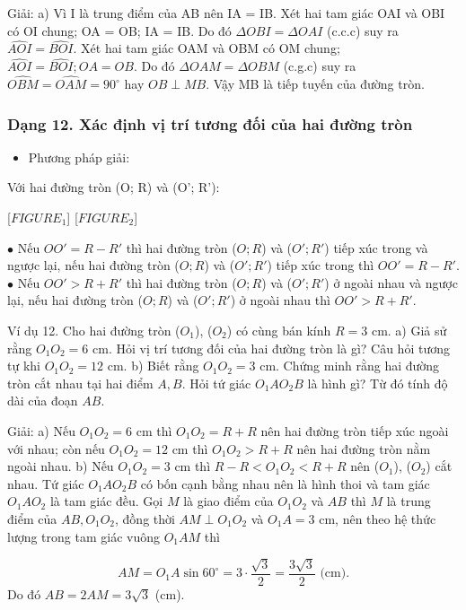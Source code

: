 \documentclass[%
    fontsize=12pt,%
    chapterprefix=false,%
    open=right,%
    twoside=false,%
    numbers=noenddot,%
    headings=optiontohead,%
    final,%
    DIV=15,%
    parskip=half %
]{scrbook}
\begin{document}
Giải: a) Vì I là trung điểm của AB nên IA = IB. Xét hai tam giác OAI và OBI có OI chung; OA = OB; IA = IB. Do đó $ \Delta OBI = \Delta OAI $ (c.c.c) suy ra $ \widehat{AOI} = \widehat{BOI} $. Xét hai tam giác OAM và OBM có OM chung; $ \widehat{AOI} = \widehat{BOI} ; OA = OB $. Do đó $ \Delta OAM = \Delta OBM $ (c.g.c) suy ra $ \widehat{OBM} = \widehat{OAM} = 90^\circ $ hay $ OB \perp MB $. Vậy MB là tiếp tuyến của đường tròn.
\subsubsection{Dạng 12. Xác định vị trí tương đối của hai đường tròn}

\begin{itemize}
  \item Phương pháp giải:
\end{itemize}

Với hai đường tròn (O; R) và (O'; R'):

[$FIGURE_1$] [$FIGURE_2$]


$\bullet$ Nếu $ OO' = R - R' $ thì hai đường tròn ($ O; R $) và ($ O'; R' $) tiếp xúc trong và ngược lại, nếu hai đường tròn ($ O; R $) và ($ O'; R' $) tiếp xúc trong thì $ OO' = R - R' $. $\bullet$ Nếu $ OO' > R + R' $ thì hai đường tròn ($ O; R $) và ($ O'; R' $) ở ngoài nhau và ngược lại, nếu hai đường tròn ($ O; R $) và ($ O'; R' $) ở ngoài nhau thì $ OO' > R + R' $.

Ví dụ 12. Cho hai đường tròn ($ O_1 $), ($ O_2 $) có cùng bán kính $ R = 3 $ cm. a) Giả sử rằng $ O_1O_2 = 6 $ cm. Hỏi vị trí tương đối của hai đường tròn là gì? Câu hỏi tương tự khi $ O_1O_2 = 12 $ cm. b) Biết rằng $ O_1O_2 = 3 $ cm. Chứng minh rằng hai đường tròn cắt nhau tại hai điểm $ A, B $. Hỏi tứ giác $ O_1AO_2B $ là hình gì? Từ đó tính độ dài của đoạn $ AB $.

Giải: a) Nếu $ O_1O_2 = 6 $ cm thì $ O_1O_2 = R + R $ nên hai đường tròn tiếp xúc ngoài với nhau; còn nếu $ O_1O_2 = 12 $ cm thì $ O_1O_2 > R + R $ nên hai đường tròn nằm ngoài nhau. b) Nếu $ O_1O_2 = 3 $ cm thì $ R - R < O_1O_2 < R + R $ nên ($ O_1 $), ($ O_2 $) cắt nhau. Tứ giác $ O_1AO_2B $ có bốn cạnh bằng nhau nên là hình thoi và tam giác $ O_1AO_2 $ là tam giác đều. Gọi $ M $ là giao điểm của $ O_1O_2 $ và $ AB $ thì $ M $ là trung điểm của $ AB, O_1O_2 $, đồng thời $ AM \perp O_1O_2 $ và $ O_1A = 3 $ cm, nên theo hệ thức lượng trong tam giác vuông $ O_1AM $ thì

\[
AM = O_1A \sin 60^\circ = 3 \cdot \frac{\sqrt{3}}{2} = \frac{3\sqrt{3}}{2} \text{ (cm)}.
\]
Do đó $ AB = 2AM = 3\sqrt{3} $ (cm).
\end{document}
